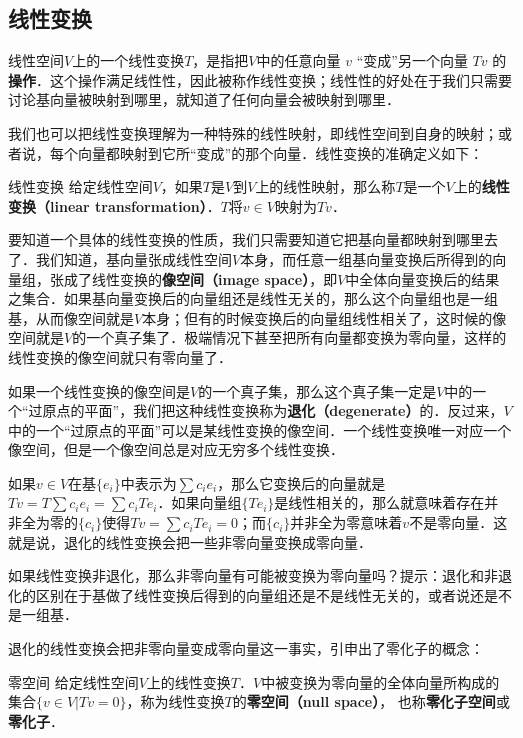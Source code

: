 \subsection{线性变换}
线性空间$V$上的一个线性变换$T$，是指把$V$中的任意向量 ${v}$ “变成”另一个向量 $T {v}$ 的\textbf{操作}．这个操作满足线性性，因此被称作线性变换；线性性的好处在于我们只需要讨论基向量被映射到哪里，就知道了任何向量会被映射到哪里．

我们也可以把线性变换理解为一种特殊的线性映射，即线性空间到自身的映射；或者说，每个向量都映射到它所“变成”的那个向量．线性变换的准确定义如下：

\begin{definition}{线性变换}
给定线性空间$V$，如果$T$是$V$到$V$上的线性映射，那么称$T$是一个$V$上的\textbf{线性变换（linear transformation）}．$T$将${v}\in V$映射为$T{v}$．
\end{definition}

要知道一个具体的线性变换的性质，我们只需要知道它把基向量都映射到哪里去了．我们知道，基向量张成线性空间$V$本身，而任意一组基向量变换后所得到的向量组，张成了线性变换的\textbf{像空间（image space）}，即$V$中全体向量变换后的结果之集合．如果基向量变换后的向量组还是线性无关的，那么这个向量组也是一组基，从而像空间就是$V$本身；但有的时候变换后的向量组线性相关了，这时候的像空间就是$V$的一个真子集了．极端情况下甚至把所有向量都变换为零向量，这样的线性变换的像空间就只有零向量了．

如果一个线性变换的像空间是$V$的一个真子集，那么这个真子集一定是$V$中的一个“过原点的平面”，我们把这种线性变换称为\textbf{退化（degenerate）}的．反过来，$V$中的一个“过原点的平面”可以是某线性变换的像空间．一个线性变换唯一对应一个像空间，但是一个像空间总是对应无穷多个线性变换．

如果${v}\in V$在基$\{{e}_i\}$中表示为$\sum c_i {e}_i$，那么它变换后的向量就是$T {v}=T\sum c_i {e}_i=\sum c_iT {e}_i$．如果向量组$\{T {e}_i\}$是线性相关的，那么就意味着存在并非全为零的$\{c_i\}$使得$T {v}=\sum c_iT {e}_i=0$；而$\{c_i\}$并非全为零意味着${v}$不是零向量．这就是说，退化的线性变换会把一些非零向量变换成零向量．

\begin{exercise}{}
如果线性变换非退化，那么非零向量有可能被变换为零向量吗？提示：退化和非退化的区别在于基做了线性变换后得到的向量组还是不是线性无关的，或者说还是不是一组基．
\end{exercise}

退化的线性变换会把非零向量变成零向量这一事实，引申出了零化子的概念：

\begin{definition}{零空间}\label{LinMap_def2}
给定线性空间$V$上的线性变换$T$．$V$中被变换为零向量的全体向量所构成的集合$\{{v}\in V|T{v}= {0}\}$，称为线性变换$T$的\textbf{零空间（null space）}， 也称\textbf{零化子空间}或\textbf{零化子}．
\end{definition}


